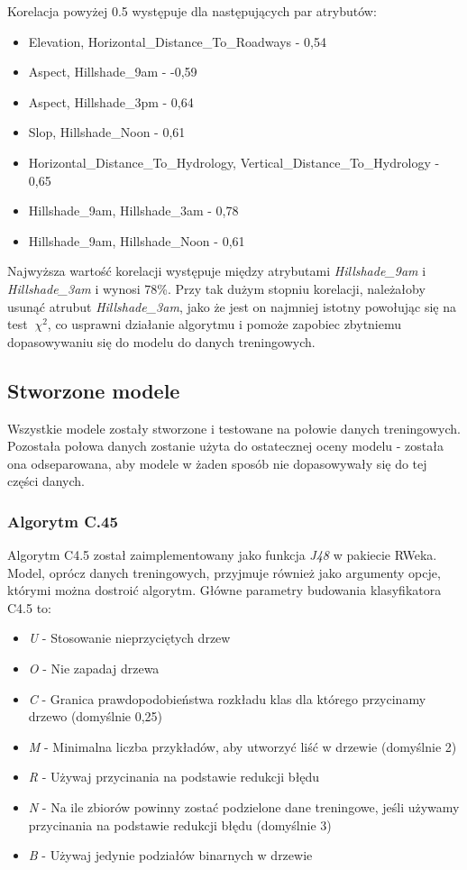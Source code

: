 \documentclass[11pt]{article} %
\begin{document}
Korelacja powyżej 0.5 występuje dla następujących par atrybutów:
\begin{itemize}
\item Elevation, Horizontal\_Distance\_To\_Roadways - 0,54
\item Aspect, Hillshade\_9am - -0,59
\item Aspect, Hillshade\_3pm - 0,64
\item Slop, Hillshade\_Noon - 0,61
\item Horizontal\_Distance\_To\_Hydrology, Vertical\_Distance\_To\_Hydrology - 0,65
\item Hillshade\_9am, Hillshade\_3am - 0,78
\item Hillshade\_9am, Hillshade\_Noon - 0,61
\end{itemize}

Najwyższa wartość korelacji występuje między atrybutami \emph{Hillshade\_9am} i \emph{Hillshade\_3am} i wynosi 78\%. Przy tak dużym stopniu korelacji, należałoby usunąć atrubut \emph{Hillshade\_3am}, jako że jest on najmniej istotny powołując się na test  $\ \chi^2 $, co usprawni działanie algorytmu i pomoże zapobiec zbytniemu dopasowywaniu się do modelu do danych treningowych.

\subsection{Stworzone modele}

Wszystkie modele zostały stworzone i testowane na połowie danych treningowych. Pozostała połowa danych zostanie użyta do ostatecznej oceny modelu - została ona odseparowana, aby modele w żaden sposób nie dopasowywały się do tej części danych.

\subsubsection{Algorytm C.45}

Algorytm C4.5 został zaimplementowany jako funkcja \emph{J48}  w pakiecie RWeka. Model, oprócz danych treningowych, przyjmuje również jako argumenty opcje, którymi można dostroić algorytm. Główne parametry budowania klasyfikatora C4.5 to:
\begin{itemize}
\item \emph{U} - Stosowanie nieprzyciętych drzew
\item \emph{O} - Nie zapadaj drzewa
\item \emph{C} - Granica prawdopodobieństwa rozkładu klas dla którego przycinamy drzewo (domyślnie 0,25)
\item \emph{M} - Minimalna liczba przykładów, aby utworzyć liść w drzewie (domyślnie 2)
\item \emph{R} - Używaj przycinania na podstawie redukcji błędu
\item \emph{N} - Na ile zbiorów powinny zostać podzielone dane treningowe, jeśli używamy przycinania na podstawie redukcji błędu (domyślnie 3)
\item \emph{B} - Używaj jedynie podziałów binarnych w drzewie
\end{itemize}
\end{document}
